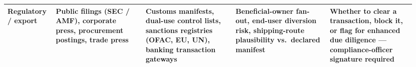 \begin{longtable}{@{}p{0.11\linewidth}p{0.21\linewidth}p{0.21\linewidth}p{0.22\linewidth}p{0.20\linewidth}@{}}
\textbf{Regulatory / export} &
Public filings (SEC / AMF), corporate press, procurement postings, trade press &
Customs manifests, dual-use control lists, sanctions registries (OFAC, EU, UN), banking transaction gateways &
Beneficial-owner fan-out, end-user diversion risk, shipping-route plausibility vs.\ declared manifest &
Whether to clear a transaction, block it, or flag for enhanced due diligence --- compliance-officer signature required \\

\bottomrule
\end{longtable}


